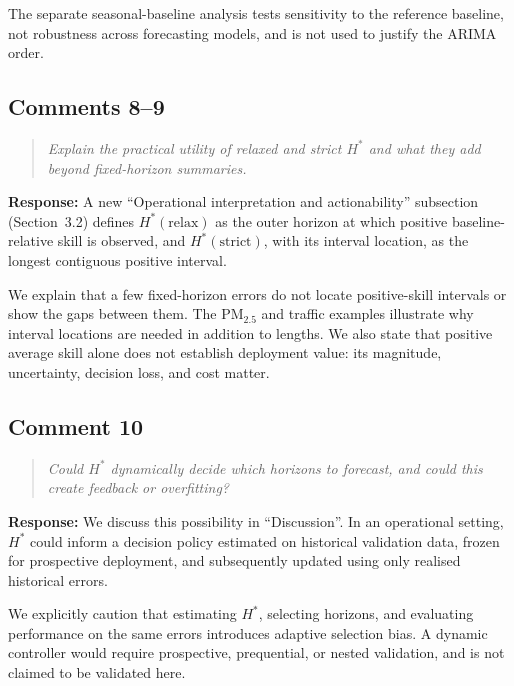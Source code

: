 \documentclass[11pt,a4paper]{article}
\let\originalsubsection\subsection
\renewcommand{\subsection}{\Needspace{9\baselineskip}\originalsubsection}
\newenvironment{reviewcomment}
  {\begin{quote}\itshape}
  {\end{quote}}
\newcommand{\response}{\noindent\textbf{Response:} }
\begin{document}
The separate seasonal-baseline analysis tests sensitivity to the reference
baseline, not robustness across forecasting models, and is not used to justify
the ARIMA order.


\subsection*{Comments 8--9}

\begin{reviewcomment}
Explain the practical utility of relaxed and strict $H^*$ and what they add
beyond fixed-horizon summaries.
\end{reviewcomment}

\response
A new ``Operational interpretation and actionability'' subsection
(Section~3.2) defines $H^*(\mathrm{relax})$ as the outer horizon at
which positive baseline-relative skill is observed, and $H^*(\mathrm{strict})$,
with its interval location, as the longest contiguous positive interval.

We explain that a few fixed-horizon errors do not locate positive-skill
intervals or show the gaps between them. The PM$_{2.5}$ and traffic
examples illustrate why interval locations are needed in addition to
lengths. We also state that positive average skill alone does not establish
deployment value: its magnitude, uncertainty, decision loss, and cost matter.


\subsection*{Comment 10}

\begin{reviewcomment}
Could $H^*$ dynamically decide which horizons to forecast, and could this
create feedback or overfitting?
\end{reviewcomment}

\response
We discuss this possibility in ``Discussion''. In an
operational setting, $H^*$ could inform a decision policy estimated on
historical validation data, frozen for prospective deployment, and subsequently
updated using only realised historical errors.

We explicitly caution that estimating $H^*$, selecting horizons, and
evaluating performance on the same errors introduces adaptive selection bias.
A dynamic controller would require prospective, prequential, or nested
validation, and is not claimed to be validated here.


\end{document}
